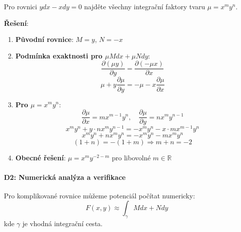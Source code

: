 \vspace{0.6\baselineskip}

\begin{example}
Pro rovnici $y dx - x dy = 0$ najděte všechny integrační faktory tvaru $\mu = x^m y^n$.
\vspace{0.3\baselineskip}

\textbf{Řešení}:
\begin{enumerate}
\item \textbf{Původní rovnice}: $M = y$, $N = -x$
\item \textbf{Podmínka exaktnosti pro $\mu M dx + \mu N dy$}:
\[
\frac{\partial (\mu y)}{\partial y} = \frac{\partial (-\mu x)}{\partial x}
\]
\[
\mu + y\frac{\partial \mu}{\partial y} = -\mu - x\frac{\partial \mu}{\partial x}
\]

\item \textbf{Pro $\mu = x^m y^n$}:
\[
\frac{\partial \mu}{\partial x} = m x^{m-1} y^n, \quad \frac{\partial \mu}{\partial y} = n x^m y^{n-1}
\]
\[
x^m y^n + y \cdot n x^m y^{n-1} = -x^m y^n - x \cdot m x^{m-1} y^n
\]
\[
x^m y^n + n x^m y^n = -x^m y^n - m x^m y^n
\]
\[
(1 + n) = -(1 + m) \Rightarrow m + n = -2
\]

\item \textbf{Obecné řešení}: $\mu = x^m y^{-2-m}$ pro libovolné $m \in \mathbb{R}$
\end{enumerate}
\end{example}

\vspace{0.8\baselineskip}

\paragraph*{D2: Numerická analýza a verifikace}

\begin{method}
Pro komplikované rovnice můžeme potenciál počítat numericky:
\[
F(x, y) \approx \int_{\gamma} M dx + N dy
\]
kde $\gamma$ je vhodná integrační cesta.
\end{method}

\vspace{0.6\baselineskip}

